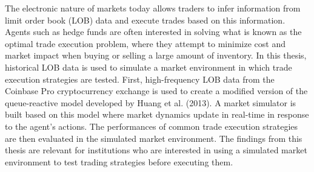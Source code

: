 The electronic nature of markets today allows traders to infer information from limit order book (LOB) data and execute trades based on this information. Agents such as hedge funds are often interested in solving what is known as the optimal trade execution problem, where they attempt to minimize cost and market impact when buying or selling a large amount of inventory. In this thesis, historical LOB data is used to simulate a market environment in which trade execution strategies are tested. First, high-frequency LOB data from the Coinbase Pro cryptocurrency exchange is used to create a modified version of the queue-reactive model developed by Huang et al. (2013). A market simulator is built based on this model where market dynamics update in real-time in response to the agent's actions. The performances of common trade execution strategies are then evaluated in the simulated market environment. The findings from this thesis are relevant for institutions who are interested in using a simulated market environment to test trading strategies before executing them.